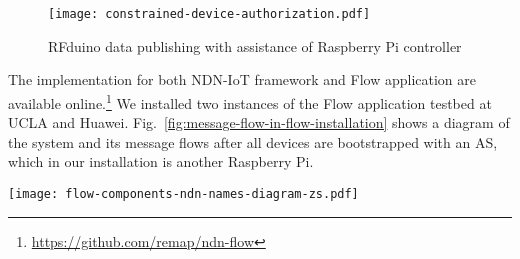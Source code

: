 \begin{figure}[!t]
\centering
\texttt{[image: constrained-device-authorization.pdf]}
\caption{RFduino data publishing with assistance of Raspberry Pi controller}
\label{fig:contrained-devices-bootstrap}
\end{figure}

The implementation for both NDN-IoT framework and Flow application are available online.\footnote{\url{https://github.com/remap/ndn-flow}} We installed two instances of the Flow application testbed at UCLA and Huawei. Fig.~\ref{fig:message-flow-in-flow-installation} shows a diagram of the system and its message flows after all devices are bootstrapped with an AS, which in our installation is another Raspberry Pi.

\begin{figure*}[!t]
\centering
\texttt{[image: flow-components-ndn-names-diagram-zs.pdf]}
\caption{Application components and message flows in Flow}
\label{fig:message-flow-in-flow-installation}
\end{figure*}

